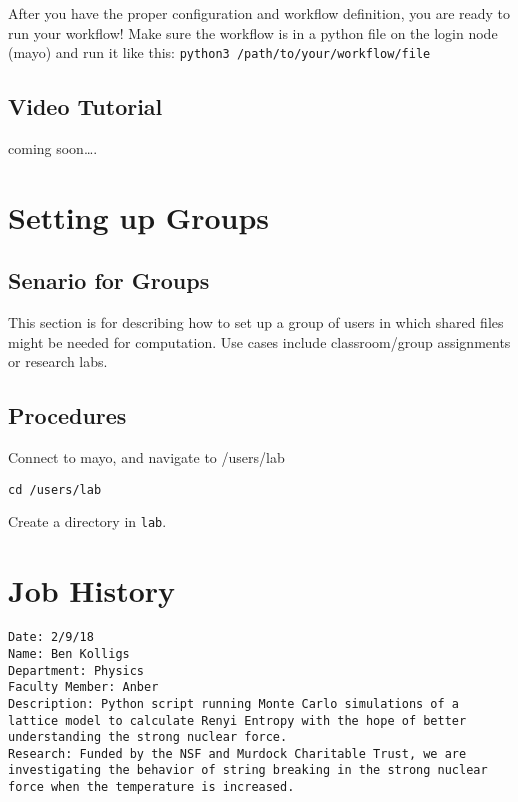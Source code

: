 \documentclass[]{book}
\begin{document}
After you have the proper configuration and workflow definition, you are
ready to run your workflow! Make sure the workflow is in a python file
on the login node (mayo) and run it like this:
\texttt{python3\ /path/to/your/workflow/file}

\section{Video Tutorial}\label{video-tutorial}

coming soon\ldots{}.

\chapter{Setting up Groups}\label{setting-up-groups}

\section{Senario for Groups}\label{senario-for-groups}

This section is for describing how to set up a group of users in which
shared files might be needed for computation. Use cases include
classroom/group assignments or research labs.

\section{Procedures}\label{procedures}

Connect to mayo, and navigate to /users/lab

\begin{verbatim}
cd /users/lab
\end{verbatim}

Create a directory in \texttt{lab}.

\appendix


\chapter{Job History}\label{job-history}

\begin{verbatim}
Date: 2/9/18
Name: Ben Kolligs
Department: Physics
Faculty Member: Anber
Description: Python script running Monte Carlo simulations of a lattice model to calculate Renyi Entropy with the hope of better understanding the strong nuclear force.
Research: Funded by the NSF and Murdock Charitable Trust, we are investigating the behavior of string breaking in the strong nuclear force when the temperature is increased.
\end{verbatim}
\end{document}
